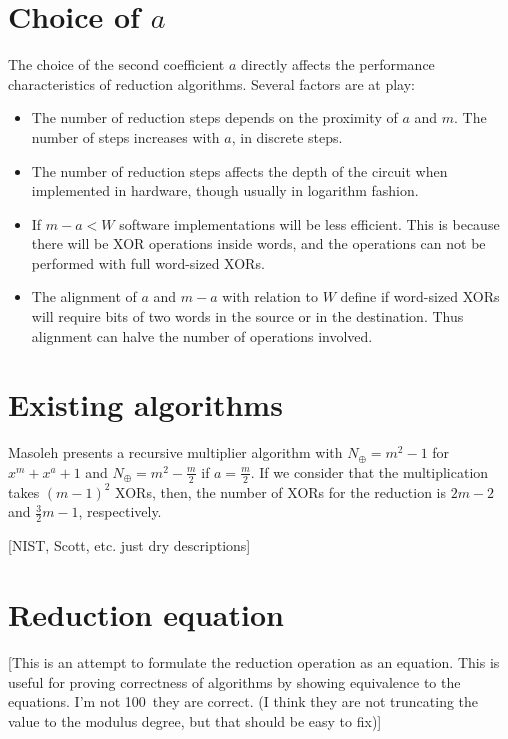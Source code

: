\section{Choice of $a$}

The choice of the second coefficient $a$ directly affects the performance characteristics of reduction algorithms. Several factors are at play:

\begin{itemize}
\item The number of reduction steps depends on the proximity of $a$ and $m$. The number of steps increases with $a$, in discrete steps.
\item The number of reduction steps affects the depth of the circuit when implemented in hardware, though usually in logarithm fashion.
\item If $m-a < W$ software implementations will be less efficient. This is because there will be XOR operations inside words, and the operations can not be performed with full word-sized XORs.
\item The alignment of $a$ and $m-a$ with relation to $W$ define if word-sized XORs will require bits of two words in the source or in the destination. Thus alignment can halve the number of operations involved.
\end{itemize}

\section{Existing algorithms}\label{existing-algorithms}

Masoleh \cite[p. 953]{Masoleh} presents a recursive multiplier algorithm with $N_\oplus = m^2-1$ for $x^m + x^a + 1$ and $N_\oplus = m^2-\frac{m}{2}$ if $a = \frac{m}{2}$. If we consider that the multiplication takes ${(m-1)}^2$ XORs, then, the number of XORs for the reduction is $2m-2$ and $\frac{3}{2}m-1$, respectively. 

{[}NIST, Scott, etc. just dry descriptions{]}

\section{Reduction equation}

[This is an attempt to formulate the reduction operation as an equation. This is useful for proving correctness of algorithms by showing equivalence to the equations. I'm not 100\ they are correct. (I think they are not truncating the value to the modulus degree, but that should be easy to fix)]

